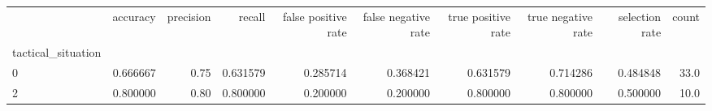 \begin{tabular}{lrrrrrrrrr}
\toprule
{} &  accuracy &  precision &    recall &  false positive rate &  false negative rate &  true positive rate &  true negative rate &  selection rate &  count \\
tactical\_situation &           &            &           &                      &                      &                     &                     &                 &        \\
\midrule
0                  &  0.666667 &       0.75 &  0.631579 &             0.285714 &             0.368421 &            0.631579 &            0.714286 &        0.484848 &   33.0 \\
2                  &  0.800000 &       0.80 &  0.800000 &             0.200000 &             0.200000 &            0.800000 &            0.800000 &        0.500000 &   10.0 \\
\bottomrule
\end{tabular}
